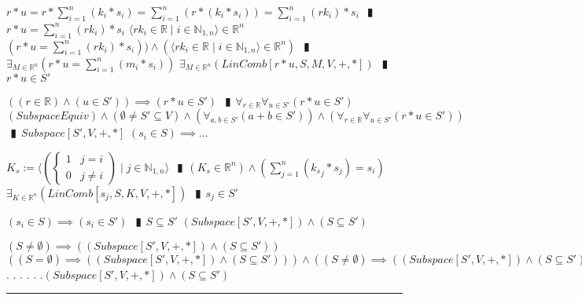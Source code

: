 \documentclass{book}
\newcommand{\abr}{:=}
\newcommand{\cont}{\phantom{.}. . .\phantom{.}}
\newcommand{\pipe}{$\phantom{(}\vrectangleblack\phantom{)}$}
\newcommand{\st}{\mathbin{|}}
\begin{document}
\begin{shaded}
\begin{enumerate}
\begin{enumerate}
\begin{enumerate}
        \lit $r * u = r * \sum_{i = 1}^{n}(k_i * s_i) = \sum_{i = 1}^{n}(r * (k_i * s_i)) = \sum_{i = 1}^{n}(r k_i) * s_i$ \pipe $r * u = \sum_{i = 1}^{n}(r k_i) * s_i$
        \lit $\langle r k_i \in \mathbb{R} \st i \in \mathbb{N}_{1, n} \rangle \in \mathbb{R}^n$
        \lit $(r * u = \sum_{i = 1}^{n}(r k_i) * s_i)) \land (\langle r k_i \in \mathbb{R} \st i \in \mathbb{N}_{1, n} \rangle \in \mathbb{R}^n)$ \pipe $\exists_{M \in \mathbb{R}^n}(r * u = \sum_{i = 1}^{n}(m_i * s_i))$ 
        \lit $\exists_{M \in \mathbb{R}^n}(LinComb[r * u, S, M, V, +, *])$ \pipe $r * u \in S'$
      \end{enumerate}
      \lit $((r \in \mathbb{R}) \land (u \in S')) \implies (r * u \in S')$ \pipe $\forall_{r \in \mathbb{R}} \forall_{u \in S'}(r * u \in S')$
      \lit $(SubspaceEquiv) \land (\emptyset \neq S' \subseteq V) \land (\forall_{a, b \in S'}(a + b \in S')) \land (\forall_{r \in \mathbb{R}} \forall_{u \in S'}(r * u \in S'))$ \pipe $Subspace[S', V, +, *]$
      \lit $(s_i \in S) \implies \ldots$
      \begin{enumerate}
        \lit $K_s \abr \langle \left(\begin{cases} 
          1 & j = i \\
          0 & j \neq i 
        \end{cases}\right) \st j \in \mathbb{N}_{1, n} \rangle$ \pipe $(K_s \in \mathbb{R}^n) \land (\sum_{j = 1}^{n}({k_s}_j * s_j) = s_i)$
        \lit $\exists_{K \in \mathbb{R}^n}(LinComb[s_j, S, K, V, +, *])$ \pipe $s_j \in S'$
      \end{enumerate}
      \lit $(s_i \in S) \implies (s_i \in S')$ \pipe $S \subseteq S'$
      \lit $(Subspace[S', V, +, *]) \land (S \subseteq S')$
    \end{enumerate}
    \lit $(S \neq \emptyset) \implies ((Subspace[S', V, +, *]) \land (S \subseteq S'))$
    \lit $((S = \emptyset) \implies ((Subspace[S', V, +, *]) \land (S \subseteq S'))) \land ((S \neq \emptyset) \implies ((Subspace[S', V, +, *]) \land (S \subseteq S')))$ \cont
    \lit \cont $(Subspace[S', V, +, *]) \land (S \subseteq S')$
  \end{enumerate} \vspace{.75mm} \hrule \vspace{.75mm} \ \\ 


\end{shaded}
\end{document}
